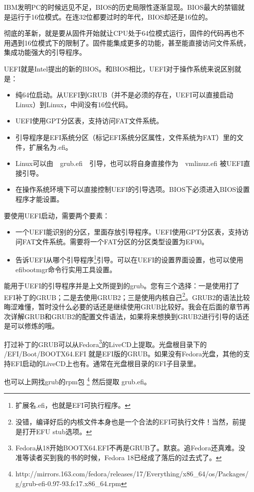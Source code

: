 \documentclass[amstex,twoside]{ctexbook}
\begin{document}
IBM发明PC的时候远见不足，BIOS的历史局限性逐渐显现。BIOS最大的禁锢就是运行于16位模式。在连32位都要过时的年代，BIOS却还是16位的。

彻底的革新，就是要从固件开始就让CPU处于64位模式运行，固件的代码再也不用遇到16位模式下的限制了。固件能集成更多的功能，甚至能直接访问文件系统，集成功能强大的引导程序。

UEFI就是Intel提出的新的BIOS。和BIOS相比，UEFI对于操作系统来说区别就是：
\begin{itemize}
\item 纯64位启动。从UEFI到GRUB（并不是必须的存在，UEFI可以直接启动Linux）到Linux，中间没有16位代码。
\item UEFI使用GPT分区表，支持访问FAT文件系统。
\item 引导程序是EFI系统分区（标记EFI系统分区属性，文件系统为FAT）里的文件，扩展名为.efi。
\item Linux可以由　grub.efi　引导，也可以将自身直接作为　vmlinuz.efi 被UEFI直接引导。
\item 在操作系统环境下可以直接控制UEFI的引导选项。BIOS下必须进入BIOS设置程序才能设置。
\end{itemize}

要使用UEFI启动，需要两个要素：
\begin{itemize}
\item 一个UEFI能识别的分区，里面存放引导程序。UEFI使用GPT分区表，支持访问FAT文件系统。需要将一个FAT分区的分区类型设置为EF00。
\item 告诉UEFI从哪个引导程序\footnote{扩展名.efi，也就是EFI可执行程序。}引导。可以在UEFI的设置界面设置，也可以使用efibootmgr命令行实用工具设置。
\end{itemize}

能用于UEFI的引导程序并是上文所提到的grub。您有三个选择：一是使用打了EFI补丁的GRUB；二是去使用GRUB2；三是使用内核自己\footnote{没错，编译好后的内核文件本身也是一个合法的EFI可执行文件！当然，前提是打开EFU stub选项。}。GRUB2的语法比较晦涩难懂，暂时没什么必要的话还是继续使用GRUB比较好。我会在后面的章节再次详解GRUB和GRUB2的配置文件语法，如果将来想换到GRUB2进行引导的话还是可以修炼的哦。

打过补丁的GRUB可以从Fedora\footnote{Fedora从18开始BOOTX64.EFI不再是GRUB了。默哀。追Fedora还真难。没准等读者买到我的书的时候，Fedora 18已经成了落后的过去式了。}的LiveCD上提取。光盘根目录下的 /EFI/Boot/BOOTX64.EFI 就是EFI版的GRUB。如果没有Fedora光盘，其他的支持EFI启动的LiveCD上也有。通常在光盘根目录的EFI子目录里。

也可以上网找grub的rpm包
\footnote{%
http://mirrors.163.com/fedora/releases/17/Everything/x86\_64/os/Packages/g/grub-efi-0.97-93.fc17.x86\_64.rpm
}
然后提取 grub.efi。
\end{document}
